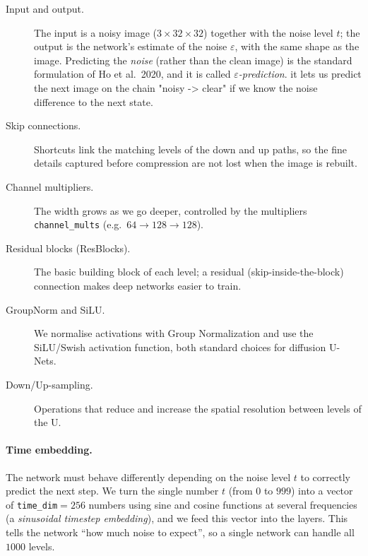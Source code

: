 \documentclass[11pt]{article}
\begin{document}
\begin{description}
  \item[Input and output.] The input is a noisy image ($3\times32\times32$) together with
        the noise level $t$; the output is the network's estimate of the noise
        $\varepsilon$, with the same shape as the image. Predicting the \emph{noise}
        (rather than the clean image) is the standard formulation of Ho et al.\ 2020, and
        it is called \emph{$\varepsilon$-prediction}. it lets us predict the next image on the chain "noisy -> clear" if we know the noise difference to the next state.
  \item[Skip connections.] Shortcuts link the matching levels of the down and up paths,
        so the fine details captured before compression are not lost when the image is
        rebuilt.
  \item[Channel multipliers.] The width grows as we go deeper, controlled by the
        multipliers \texttt{channel\_mults} (e.g.\ $64 \to 128 \to 128$).
  \item[Residual blocks (ResBlocks).] The basic building block of each level; a residual
        (skip-inside-the-block) connection makes deep networks easier to train.
  \item[GroupNorm and SiLU.] We normalise activations with Group Normalization and
        use the SiLU/Swish activation function, both standard choices for diffusion
        U-Nets.
  \item[Down/Up-sampling.] Operations that reduce and increase the spatial resolution
        between levels of the U.
\end{description}

\paragraph{Time embedding.} The network must behave differently depending on the noise
level $t$ to correctly predict the next step. We turn the single number $t$ (from $0$ to $999$) into a vector of
\texttt{time\_dim}$=256$ numbers using sine and cosine functions at several frequencies
(a \emph{sinusoidal timestep embedding}), and we feed this vector into the layers. This
tells the network ``how much noise to expect'', so a single network can handle all
$1000$ levels.
\end{document}
